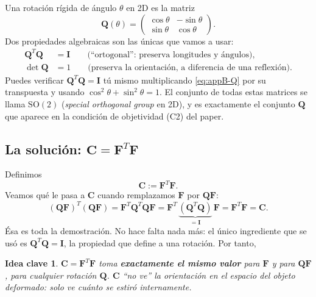 \documentclass[11pt,a4paper]{article}
\newtheorem{takeaway}{Idea clave}
\begin{document}
Una rotaci\'on r\'igida de \'angulo $\theta$ en 2D es la matriz
\begin{equation}
 \bm Q(\theta)=\begin{pmatrix}\cos\theta & -\sin\theta\\ \sin\theta & \cos\theta\end{pmatrix}.
 \label{eq:appB-Q}
\end{equation}
Dos propiedades algebraicas son las \'unicas que vamos a usar:
\begin{align}
 \bm Q^T\bm Q&=\bm I \qquad\text{(``ortogonal'': preserva longitudes y \'angulos)},\\
 \det\bm Q&=1 \qquad\text{(preserva la orientaci\'on, a diferencia de una reflexi\'on)}.
\end{align}
Puedes verificar $\bm Q^T\bm Q=\bm I$ t\'u mismo multiplicando
\eqref{eq:appB-Q} por su transpuesta y usando
$\cos^2\theta+\sin^2\theta=1$. El conjunto de todas estas matrices se
llama $\mathrm{SO}(2)$ (\emph{special orthogonal group} en 2D), y es
exactamente el conjunto $\bm Q$ que aparece en la condici\'on de
objetividad (C2) del paper.

\subsection{La soluci\'on: $\bm C=\bm F^T\bm F$}

Definimos
\begin{equation}
 \bm C:=\bm F^T\bm F.
 \label{eq:appB-C-def}
\end{equation}
Veamos qu\'e le pasa a $\bm C$ cuando remplazamos $\bm F$ por
$\bm Q\bm F$:
\begin{equation}
 (\bm Q\bm F)^T(\bm Q\bm F)
 =\bm F^T\bm Q^T\bm Q\bm F
 =\bm F^T\,\underbrace{(\bm Q^T\bm Q)}_{=\bm I}\,\bm F
 =\bm F^T\bm F=\bm C.
 \label{eq:appB-C-invariance}
\end{equation}
\'Esa es toda la demostraci\'on. No hace falta nada m\'as: el \'unico
ingrediente que se us\'o es $\bm Q^T\bm Q=\bm I$, la propiedad que
define a una rotaci\'on. Por tanto,
\begin{takeaway}
$\bm C=\bm F^T\bm F$ toma \textbf{exactamente el mismo valor} para
$\bm F$ y para $\bm Q\bm F$, para cualquier rotaci\'on $\bm Q$. $\bm C$
``no ve'' la orientaci\'on en el espacio del objeto deformado: solo
ve cu\'anto se estir\'o internamente.
\end{takeaway}
\end{document}
